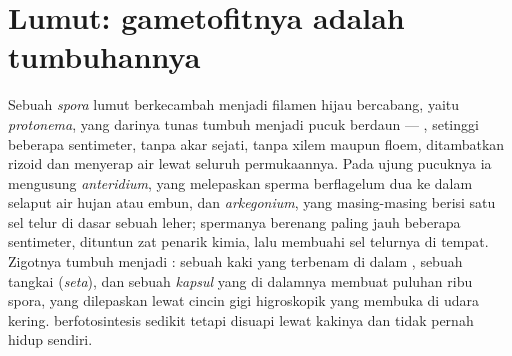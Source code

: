 \section{Lumut: gametofitnya adalah tumbuhannya}

\begin{definition}\label{def:b2:plant-life-cycles:moss}
Sebuah \emph{spora} lumut berkecambah menjadi filamen hijau bercabang,
yaitu \emph{protonema}, yang darinya tunas tumbuh menjadi pucuk berdaun
--- \emph{}, setinggi beberapa sentimeter, tanpa akar sejati,
tanpa xilem maupun floem, ditambatkan rizoid dan menyerap air lewat
seluruh permukaannya. Pada ujung pucuknya ia mengusung
\emph{anteridium}, yang melepaskan sperma berflagelum dua ke dalam
selaput air hujan atau embun, dan \emph{arkegonium}, yang masing-masing
berisi satu sel telur di dasar sebuah leher; spermanya berenang paling
jauh beberapa sentimeter, dituntun zat penarik kimia, lalu membuahi sel
telurnya di tempat. Zigotnya tumbuh menjadi \emph{}: sebuah
kaki yang terbenam di dalam , sebuah tangkai (\emph{seta}),
dan sebuah \emph{kapsul} yang di dalamnya  membuat puluhan ribu
spora, yang dilepaskan lewat cincin gigi higroskopik yang membuka di
udara kering.  berfotosintesis sedikit tetapi disuapi
 lewat kakinya dan tidak pernah hidup sendiri.
\end{definition}

